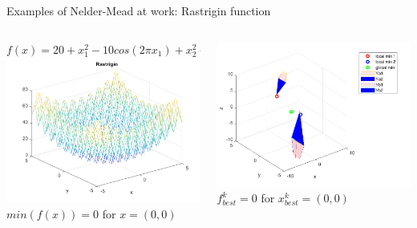 \documentclass{beamer}
\begin{document}
\begin{frame}{Examples of Nelder-Mead at work: Rastrigin function}
\begin{columns}
\begin{column}{0.49\linewidth}
	\small $f(x) = 20 + x_1^2 - 10cos(2\pi x_1) + x_2^2 - 10cos(2\pi x_2)$ \\
	\includegraphics[width=0.95\linewidth]{rastriginFunction}	 \\
	$min(f(x))= 0 $ for $x = (0,0)$
\end{column}
\begin{column}{0.49\linewidth}
	\includegraphics[width=0.95\linewidth]{Rastrigin1} \\
	$f^k_{best}= 0 $ for $x^k_{best}= (0,0)$
\end{column}
\end{columns}
\end{frame}
\end{document}

